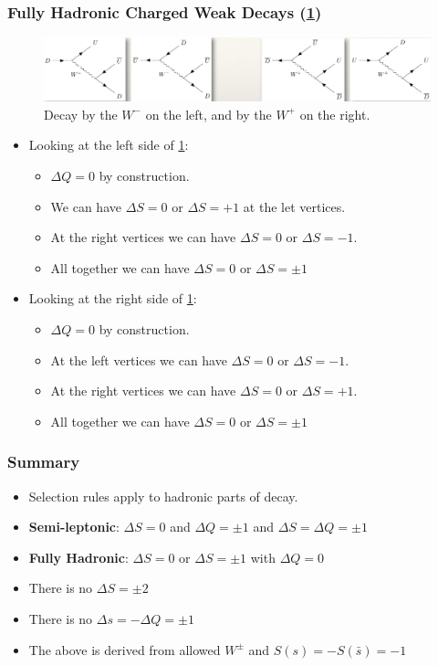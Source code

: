 \subsubsection{Fully Hadronic Charged Weak Decays (\cref{fig: fully_hadronic_charged_weak_decays})}
\begin{figure}[ht!]
    \centering
    \includegraphics[width = .8\textwidth]{fully_hadronic_charged_weak_decays.png}
    \caption{Decay by the $W^{-}$ on the left, and by the $W^{+}$ on the right.}
    \label{fig: fully_hadronic_charged_weak_decays}
    \end{figure}

\begin{itemize} 
  \item Looking at the left side of \cref{fig: fully_hadronic_charged_weak_decays}:
  \begin{itemize}
    \item $ΔQ = 0$ by construction. 
    \item We can have $ΔS = 0$ or $ΔS = +1$ at the let vertices. 
    \item At the right vertices we can have $ΔS = 0$ or $ΔS = -1$. 
    \item All together we can have $ΔS = 0$ or $ΔS = ±1$
  \end{itemize}
  \item Looking at the right side of \cref{fig: fully_hadronic_charged_weak_decays}:
  \begin{itemize}
    \item $ΔQ = 0$ by construction.
    \item At the left vertices we can have $ΔS = 0$ or $ΔS = -1$.
    \item At the right vertices we can have $ΔS = 0$ or $ΔS = +1$.
    \item All together we can have $ΔS = 0$ or $ΔS = ±1$
  \end{itemize}
\end{itemize}

\subsubsection{Summary}
\begin{itemize}
  \item Selection rules apply to hadronic parts of decay. 
  \item \textbf{Semi-leptonic}: $ΔS = 0$ and $ΔQ = ±1$ and $ΔS = ΔQ = ±1$
  \item \textbf{Fully Hadronic}: $ΔS = 0$ or $ΔS = ±1$ with $ΔQ = 0$
  \item There is no $ΔS = ±2$
  \item There is no $Δs = -ΔQ = ±1$
  \item The above is derived from allowed $W^{±}$ and $S(s) = -S(\bar{s}) = -1$
\end{itemize}

